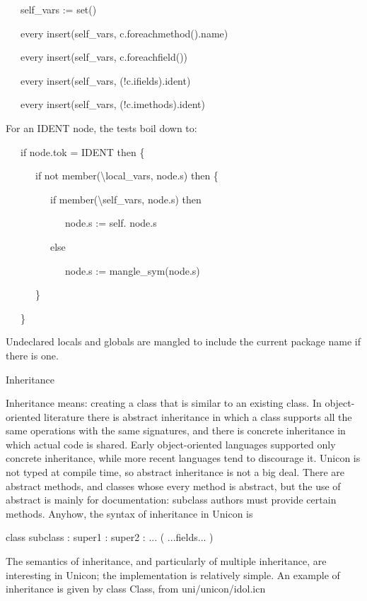 {\ttfamily\mdseries
\ \ \ self\_vars := set()}

{\ttfamily\mdseries
\ \ \ every insert(self\_vars, c.foreachmethod().name)}

{\ttfamily\mdseries
\ \ \ every insert(self\_vars, c.foreachfield())}

{\ttfamily\mdseries
\ \ \ every insert(self\_vars, (!c.ifields).ident)}

{\ttfamily\mdseries
\ \ \ every insert(self\_vars, (!c.imethods).ident)}

For an IDENT node, the tests boil down to: 

{\ttfamily\mdseries
\ \ \ if node.tok = IDENT then \{}

{\ttfamily\mdseries
\ \ \ \ \ \ if not member({\textbackslash}local\_vars, node.s) then \{}

{\ttfamily\mdseries
\ \ \ \ \ \ \ \ \ if member({\textbackslash}self\_vars, node.s) then}

{\ttfamily\mdseries
\ \ \ \ \ \ \ \ \ \ \ \ node.s := {\textquotedbl}self.{\textquotedbl} {\textbar}{\textbar} node.s}

{\ttfamily\mdseries
\ \ \ \ \ \ \ \ \ else }

{\ttfamily\mdseries
\ \ \ \ \ \ \ \ \ \ \ \ node.s := mangle\_sym(node.s)}

{\ttfamily\mdseries
\ \ \ \ \ \ \}}

{\ttfamily\mdseries
\ \ \ \}}


Undeclared locals and globals are mangled to include the current
package name if there is one.

{\sffamily
Inheritance }


Inheritance means: creating a class that is similar to an existing
class. In object-oriented literature there is {\textquotedbl}abstract
inheritance{\textquotedbl} in which a class supports all the same
operations with the same signatures, and there is concrete inheritance
in which actual code is shared. Early object-oriented languages
supported only concrete inheritance, while more recent languages tend
to discourage it. Unicon is not typed at compile time, so abstract
inheritance is not a big deal. There are abstract methods, and classes
whose every method is abstract, but the use of abstract is mainly for
documentation: subclass authors must provide certain methods. Anyhow,
the syntax of inheritance in Unicon is

{\ttfamily\mdseries
class subclass : super1 : super2 : ... ( ...fields... )}


The semantics of inheritance, and particularly of multiple
inheritance, are interesting in Unicon; the implementation is
relatively simple. An example of inheritance is given by class Class,
from uni/unicon/idol.icn

